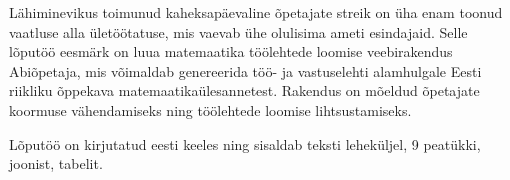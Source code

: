 Lähiminevikus toimunud kaheksapäevaline õpetajate streik on üha enam toonud vaatluse alla ületöötatuse, mis vaevab ühe olulisima ameti esindajaid. Selle lõputöö eesmärk on luua matemaatika töölehtede loomise veebirakendus Abiõpetaja, mis võimaldab genereerida töö- ja vastuselehti alamhulgale Eesti riikliku õppekava matemaatikaülesannetest. Rakendus on mõeldud õpetajate koormuse vähendamiseks ning töölehtede loomise lihtsustamiseks.

Lõputöö on kirjutatud eesti keeles ning sisaldab teksti  leheküljel, 9 peatükki,  joonist,  tabelit.


